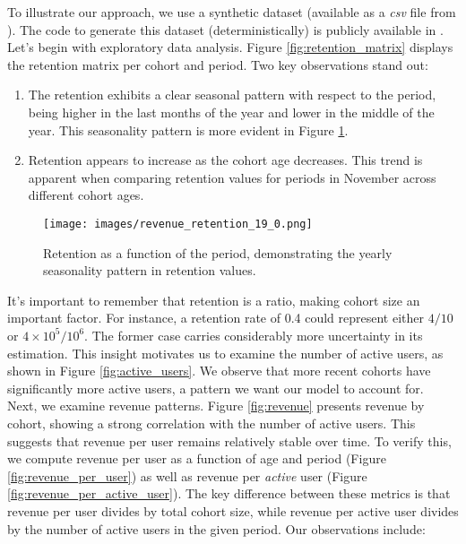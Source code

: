 \documentclass[11pt]{amsart}
\theoremstyle{definition}
\begin{document}
To illustrate our approach, we use a synthetic dataset (available as a {\em csv} file from \cite{orduz_revenue_retention}).
The code to generate this dataset (deterministically) is publicly available in \cite{orduz_revenue_retention_data_code}.
Let's begin with exploratory data analysis. Figure \ref{fig:retention_matrix} displays the retention matrix per cohort and
period. Two key observations stand out:

\begin{enumerate}
    \item The retention exhibits a clear seasonal pattern with respect to the period, being higher in the last months of the
          year and lower in the middle of the year. This seasonality pattern is more evident in Figure
          \ref{fig:retention_seasonal}.
    \item Retention appears to increase as the cohort age decreases. This trend is apparent when comparing retention values
          for periods in November across different cohort ages.
\end{enumerate}

\begin{figure}
    \centering
    \texttt{[image: images/revenue\_retention\_19\_0.png]}
    \caption{Retention as a function of the period, demonstrating the yearly seasonality pattern in retention values.}
    \label{fig:retention_seasonal}
\end{figure}

It's important to remember that retention is a ratio, making cohort size an important factor. For instance, a retention rate
of 0.4 could represent either $4/10$ or $4\times 10^{5} / 10^{6}$. The former case carries considerably more uncertainty in
its estimation. This insight motivates us to examine the number of active users, as shown in Figure \ref{fig:active_users}.
We observe that more recent cohorts have significantly more active users, a pattern we want our model to account for. \\

Next, we examine revenue patterns. Figure \ref{fig:revenue} presents revenue by cohort, showing a strong correlation with the
number of active users. This suggests that revenue per user remains relatively stable over time. To verify this, we compute
revenue per user as a function of age and period (Figure \ref{fig:revenue_per_user}) as well as revenue per {\em active} user
(Figure \ref{fig:revenue_per_active_user}). The key difference between these metrics is that revenue per user divides by
total cohort size, while revenue per active user divides by the number of active users in the given period. Our observations
include:
\end{document}
